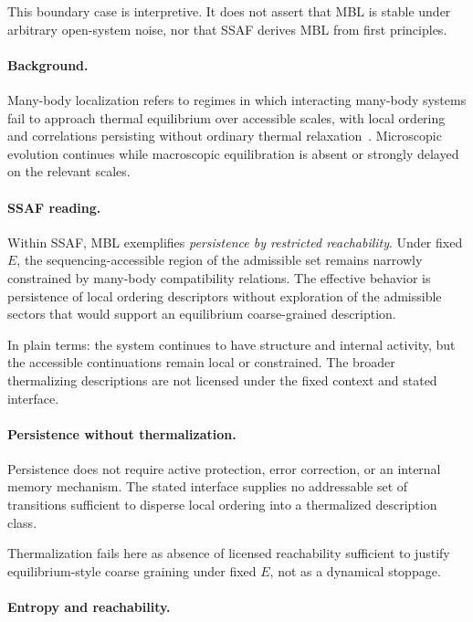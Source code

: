 \documentclass[aps,prx,onecolumn,11pt]{revtex4-2}
\theoremstyle{plain}
\theoremstyle{definition}
\theoremstyle{remark}
\begin{document}
This boundary case is interpretive. It does not assert that MBL is
stable under arbitrary open-system noise, nor that SSAF derives MBL
from first principles.

\paragraph{Background.}

Many-body localization refers to regimes in which interacting
many-body systems fail to approach thermal equilibrium over accessible
scales, with local ordering and correlations persisting without ordinary
thermal relaxation~\cite{Basko2006,Nandkishore2015}. Microscopic
evolution continues while macroscopic equilibration is absent or
strongly delayed on the relevant scales.

\paragraph{SSAF reading.}

Within SSAF, MBL exemplifies \emph{persistence by restricted
reachability}. Under fixed \(E\), the sequencing-accessible region of
the admissible set remains narrowly constrained by many-body
compatibility relations. The effective behavior is persistence of local
ordering descriptors without exploration of the admissible sectors that
would support an equilibrium coarse-grained description.

In plain terms: the system continues to have structure and internal
activity, but the accessible continuations remain local or constrained.
The broader thermalizing descriptions are not licensed under the fixed
context and stated interface.

\paragraph{Persistence without thermalization.}

Persistence does not require active protection, error correction, or an
internal memory mechanism. The stated interface supplies no addressable
set of transitions sufficient to disperse local ordering into a
thermalized description class.

Thermalization fails here as absence of licensed reachability sufficient
to justify equilibrium-style coarse graining under fixed \(E\), not as
a dynamical stoppage.

\paragraph{Entropy and reachability.}
\end{document}
